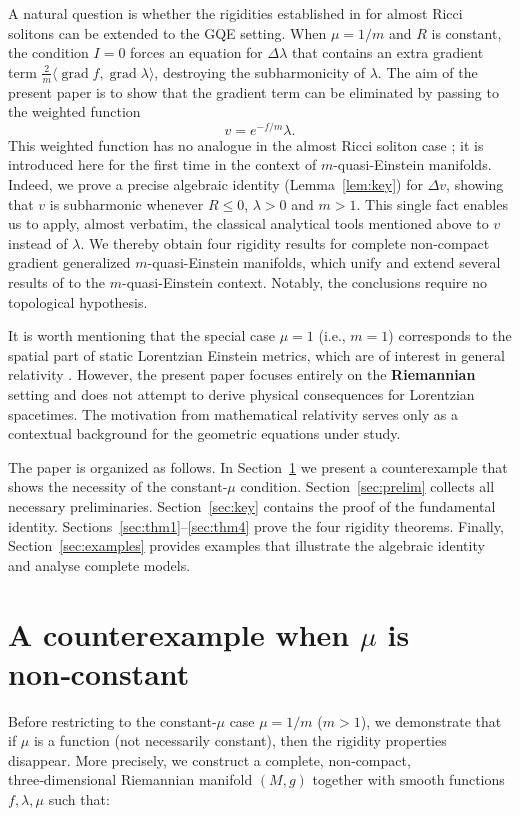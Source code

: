 \documentclass[12pt,a4paper]{article}
\newcommand{\grad}{\operatorname{grad}}
\theoremstyle{definition}
\theoremstyle{definition}
\begin{document}
A natural question is whether the rigidities established in \cite{Poddar} for almost Ricci solitons can be extended to the GQE setting.
When $\mu=1/m$ and $R$ is constant, the condition $I=0$ forces an equation for $\Delta\lambda$ that contains an extra gradient term $\frac{2}{m}\langle\grad f,\grad\lambda\rangle$, destroying the subharmonicity of $\lambda$.
The aim of the present paper is to show that the gradient term can be eliminated by passing to the weighted function
\[
v = e^{-f/m}\lambda.
\]
This weighted function has no analogue in the almost Ricci soliton case \cite{Poddar}; it is introduced here for the first time in the context of $m$-quasi-Einstein manifolds.
Indeed, we prove a precise algebraic identity (Lemma~\ref{lem:key}) for $\Delta v$, showing that $v$ is subharmonic whenever $R\le 0$, $\lambda>0$ and $m>1$.
This single fact enables us to apply, almost verbatim, the classical analytical tools mentioned above to $v$ instead of $\lambda$.
We thereby obtain four rigidity results for complete non-compact gradient generalized $m$-quasi-Einstein manifolds, which unify and extend several results of \cite{Poddar} to the $m$-quasi-Einstein context.
Notably, the conclusions require no topological hypothesis.

It is worth mentioning that the special case $\mu=1$ (i.e., $m=1$) corresponds to the spatial part of static Lorentzian Einstein metrics, which are of interest in general relativity \cite{Anderson}. However, the present paper focuses entirely on the \textbf{Riemannian} setting and does not attempt to derive physical consequences for Lorentzian spacetimes. The motivation from mathematical relativity serves only as a contextual background for the geometric equations under study.

The paper is organized as follows.
In Section~\ref{sec:counter} we present a counterexample that shows the necessity of the constant‑$\mu$ condition.
Section~\ref{sec:prelim} collects all necessary preliminaries.
Section~\ref{sec:key} contains the proof of the fundamental identity.
Sections~\ref{sec:thm1}--\ref{sec:thm4} prove the four rigidity theorems.
Finally, Section~\ref{sec:examples} provides examples that illustrate the algebraic identity and analyse complete models.

\section{A counterexample when $\mu$ is non‑constant}
\label{sec:counter}

Before restricting to the constant‑$\mu$ case $\mu=1/m$ ($m>1$), we demonstrate
that if $\mu$ is a function (not necessarily constant), then the rigidity properties
disappear.  More precisely, we construct a complete, non‑compact,
three‑dimensional Riemannian manifold $(M,g)$ together with smooth functions
$f,\lambda,\mu$ such that:
\end{document}
